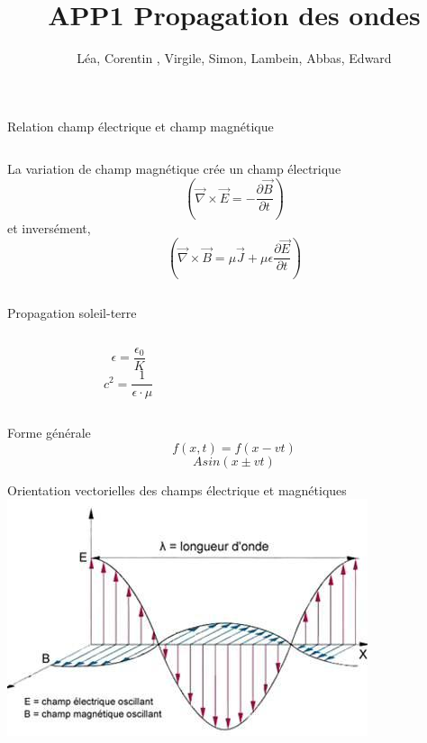 \documentclass{beamer}
\title{APP1 Propagation des ondes}
\author{\bsc{Paulus} Léa,\bsc{Joachim} Corentin , \bsc{Goyens} Virgile, \bsc{Boigelot} Simon, \bsc{Xavier} Lambein, \bsc{Sliti} Abbas, \bsc{Nicol} Edward}
\begin{document}
\begin{frame}
	\maketitle
\end{frame}
\begin{frame}{Relation champ électrique et champ magnétique}
	\begin{columns}
		\begin{column}{0.40\textwidth}
			\begin{center}
	La variation de champ magnétique crée un champ électrique 
        	$$\left( \vec{\nabla} \times \vec{E} = - \frac{\partial \vec{B}}{\partial t}\right)$$
        	et inversément,
        	$$\left( \vec{\nabla} \times \vec{B} = \mu \vec{J} + \mu \epsilon \frac{\partial \vec{E}}{\partial t} \right)$$
        	\end{center}
        	\end{column}
        	\end{columns}
        	\end{frame}
\begin{frame}{Propagation soleil-terre}
	\begin{columns}
		\begin{column}{0.40\textwidth}
			\begin{center}
				\begin{block}{}
				$$ \epsilon = \frac{\epsilon _0}{K}$$
				$$c^2 = \frac{1}{\epsilon \cdot \mu}$$
				\end{block}
			\end{center}
		\end{column}
		\begin{column}{0.55\textwidth}
        
		\end{column}
	\end{columns}
\end{frame}
\begin{frame}{Forme générale}
$$f(x,t)= f(x-vt)$$
$$A sin(x\pm vt)$$
\end{frame}
\begin{frame}{Orientation vectorielles des champs électrique et magnétiques}
\includegraphics[scale=0.5]{21bbb8c912fd1c0c4853fcb9d75a3b7c.jpg}
\end{frame}
\end{document}

